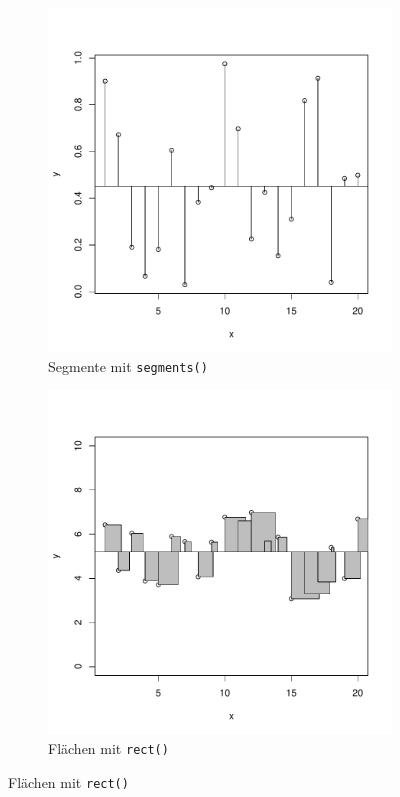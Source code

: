 \begin{figure}[h!]
\begin{subfigure}[b]{0.48\textwidth}
\includegraphics{r-cmd-015}
\caption{Segmente mit \lstinline{segments()}}
\end{subfigure}
\begin{subfigure}[b]{0.48\textwidth}
\includegraphics{r-cmd-016}
\caption{Flächen mit \lstinline{rect()}}
\end{subfigure}

\end{figure}

